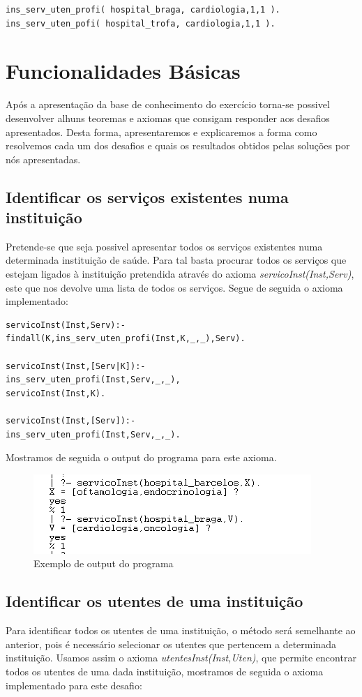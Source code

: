 \begin{verbatim}
ins_serv_uten_profi( hospital_braga, cardiologia,1,1 ).
ins_serv_uten_pofi( hospital_trofa, cardiologia,1,1 ).
\end{verbatim}

\section{Funcionalidades Básicas}
Após a apresentação da base de conhecimento do exercício torna-se possivel desenvolver alhuns teoremas e axiomas que consigam responder aos desafios apresentados. Desta forma, apresentaremos e explicaremos a forma como resolvemos cada um dos desafios e quais os resultados obtidos pelas soluções por nós apresentadas. 
\subsection{Identificar os serviços existentes numa instituição}
Pretende-se que seja possivel apresentar todos os serviços existentes numa determinada instituição de saúde. Para tal basta procurar todos os serviços que estejam ligados à instituição pretendida através do axioma \textit{servicoInst(Inst,Serv)}, este que nos devolve uma lista de todos os serviços.  
Segue de seguida o axioma implementado: 
\begin{verbatim}
servicoInst(Inst,Serv):-
findall(K,ins_serv_uten_profi(Inst,K,_,_),Serv).      

servicoInst(Inst,[Serv|K]):- 
ins_serv_uten_profi(Inst,Serv,_,_),
servicoInst(Inst,K).

servicoInst(Inst,[Serv]):- 
ins_serv_uten_profi(Inst,Serv,_,_).
\end{verbatim}

Mostramos de seguida o output do programa para este axioma. 

\begin{figure}[<+htpb+>]
	\centering
	\includegraphics[scale=0.9]{answer1.png}
	\caption{Exemplo de output do programa}
	\label{p3:fig:output1}
\end{figure}

\subsection{Identificar os utentes de uma instituição}
Para identificar todos os utentes de uma instituição, o método será semelhante ao anterior, pois é necessário selecionar os utentes que pertencem a determinada instituição. Usamos assim o axioma \textit{utentesInst(Inst,Uten)}, que permite encontrar todos os utentes de uma dada instituição, mostramos de seguida o axioma implementado para este desafio: 

